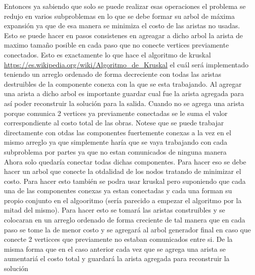Entonces ya sabiendo que solo se puede realizar esas operaciones el problema se redujo en varios subproblemas en lo que se debe formar su arbol de máxima expansión ya que de esa manera se minimiza el costo de las aristas no usadas. Esto se puede hacer en pasos consistenes en agreagar a dicho arbol la arista de maximo tamaño posible en cada paso que no conecte vertices previamente conectados. Esto es exactamente lo que hace el algoritmo de kruskal \url{https://es.wikipedia.org/wiki/Algoritmo_de_Kruskal} el cuál será implementado teniendo un arreglo ordenado de forma decreciente con todas las aristas destruibles de la componente conexa con la que se esta trabajando. Al agregar una arista a dicho arbol es importante guardar cual fue la arista agregada para así poder reconstruir la solución para la salida. Cuando no se agrega una arista porque comunica 2 vertices ya previamente conectadas se le suma el valor correspondiente al costo total de las obras. Notese que se puede trabajar directamente con otdas las componentes fuertemente conexas a la vez en el mismo arreglo ya que simplemente haría que se vaya trabajando con cada subproblema por partes ya que no estan comunicados de ninguna manera\\
Ahora solo quedaría conectar todas dichas componentes. Para hacer eso se debe hacer un arbol que conecte la otdalidad de los nodos tratando de minimizar el costo. Para hacer esto también se podra usar kruskal pero suponiendo que cada una de las componentes conexas ya estan conectadas y cada una forman su propio conjunto en el algooritmo (sería parecido a empezar el algoritmo por la mitad del mismo). Para hacer esto se tomará las aristas construibles y se colocaran en un arreglo ordenado de forma creciente de tal manera que en cada paso se tome la de menor costo y se agregará al arbol generador final en caso que conecte 2 verticces que previamente no estaban comunicados entre si. De la misma forma que en el caso anterior cada vez que se agrega una arista se aumentariá el costo total y guardará la arista agregada para reconstruir la solución\\


